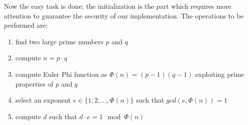 \documentclass{article}
\begin{document}
Now the easy task is done; the initialization is the part which requires more attention to guarantee the security of our implementation. The operations to be performed are:

\begin{enumerate}
	\item find two large prime numbers $p$ and $q$
	\item compute $n = p \cdot q$
	\item compute Euler Phi function as $\Phi(n) = (p-1)(q-1)$ exploiting prime properties of $p$ and $q$
	\item select an exponent $e \in \{1, 2, \dots, \Phi(n)\}$ such that $gcd(e, \Phi(n)) = 1$
	\item compute $d$ such that $d \cdot e = 1 \mod \Phi(n)$
\end{enumerate}
\end{document}
